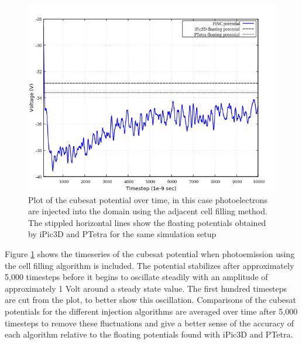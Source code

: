 \begin{figure}[H]
    \centering
    \includegraphics[scale=0.4]{figures/DECA/PhotoelectronsInjectionByCellFilling/pCellFill.png}
    \caption{Plot of the cubesat potential over time, in this case photoelectrons are injected into the domain using the adjacent cell filling method. The stippled horizontal lines show the floating potentials obtained by iPic3D and PTetra for the same simulation setup}
    \label{fig:pCellFill}
\end{figure}

Figure \ref{fig:pCellFill} shows the timeseries of the cubesat potential when photoemission using the cell filling algorithm is included. The potential stabilizes after approximately 5,000 timesteps before it begins to oscillate steadily with an amplitude of approximately 1 Volt around a steady state value. The first hundred timesteps are cut from the plot, to better show this oscillation. Comparisons of the cubesat potentials for the different injection algorithms are averaged over time after 5,000 timesteps to remove these fluctuations and give a better sense of the accuracy of each algorithm relative to the floating potentials found with iPic3D and PTetra.

